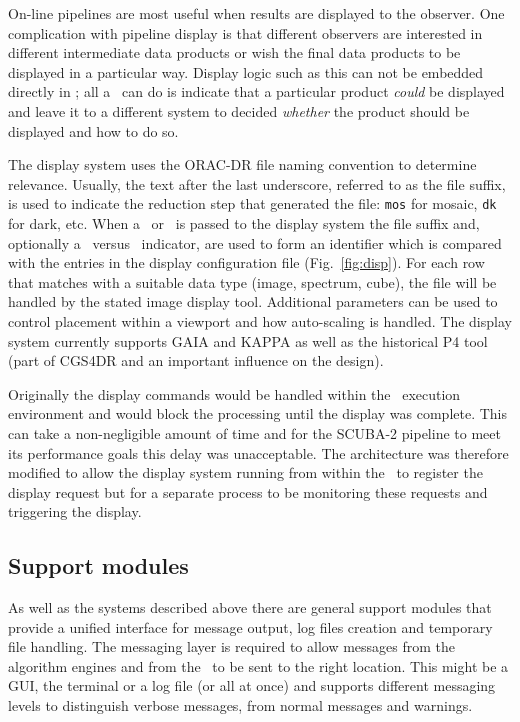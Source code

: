 \documentclass[final,authoryear,5p,times,twocolumn]{elsarticle}
\begin{document}
On-line pipelines are most useful when results are displayed to the
observer. One complication with pipeline display is that different
observers are interested in different intermediate data products or
wish the final data products to be displayed in a particular
way. Display logic such as this can not be embedded directly in
\primitives; all a \primitive\ can do is indicate that a particular
product \emph{could} be displayed and leave it to a different system
to decided \emph{whether} the product should be displayed and how to
do so.

The display system uses the ORAC-DR file naming convention to
determine relevance. Usually, the text after the last underscore,
referred to as the file suffix, is used to indicate the reduction step
that generated the file: \texttt{mos} for mosaic, \texttt{dk} for
dark, etc. When a \Frame\ or \Group\ is passed to the display system
the file suffix and, optionally a \Group\ versus \Frame\ indicator,
are used to form an identifier which is compared with the entries in
the display configuration file (Fig.\ \ref{fig:disp}). For each row
that matches with a suitable data type (image, spectrum, cube), the
file will be handled by the stated image display tool. Additional
parameters can be used to control placement within a viewport and how
auto-scaling is handled. The display system currently supports GAIA
\citep[][]{2009ASPC..411..575D} and KAPPA
\citep[][]{SUN95} as well as the historical P4 tool
(part of CGS4DR \citep{SUN27} and an important influence on the
design).

Originally the display commands would be handled within the \recipe\
execution environment and would block the processing until the display
was complete. This can take a non-negligible amount of time and for the
SCUBA-2 pipeline to meet its performance goals this delay was
unacceptable. The architecture was therefore modified to allow the
display system running from within the \recipe\ to register the
display request but for a separate process to be monitoring these
requests and triggering the display.

\subsection{Support modules}

As well as the systems described above there are general support
modules that provide a unified interface for message output, log files
creation and temporary file handling. The messaging layer is required
to allow messages from the algorithm engines and from the \primitives\
to be sent to the right location. This might be a GUI, the terminal or
a log file (or all at once) and supports different messaging levels to
distinguish verbose messages, from normal messages and warnings.
\end{document}
